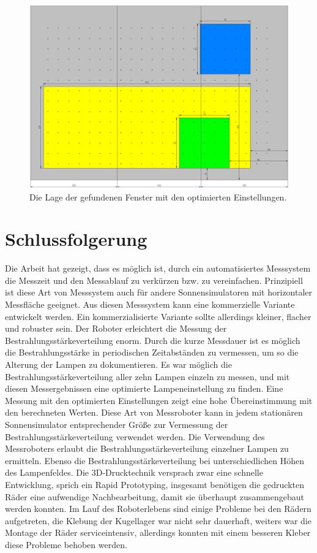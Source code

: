 \documentclass[a4paper,bibtotoc,oneside]{scrbook}
\begin{document}
\begin{figure}[htbp]
\centering
\includegraphics[width=140mm]{img/fensteropt.png}
\caption{Die Lage der gefundenen Fenster mit den optimierten Einstellungen.}\label{fopt}
\end{figure}



\FloatBarrier
 
\section{Schlussfolgerung}\thispagestyle{empty}

Die Arbeit hat gezeigt, dass es möglich ist, durch ein automatisiertes Messsystem die Messzeit und den Messablauf zu verkürzen bzw. zu vereinfachen.
Prinzipiell ist diese Art von Messsystem auch für andere Sonnensimulatoren mit horizontaler Messfläche geeignet.
Aus diesen Messsystem kann eine kommerzielle Variante entwickelt werden.
Ein kommerzialisierte Variante sollte allerdings kleiner, flacher und robuster sein.
Der Roboter erleichtert die Messung der Bestrahlungsstärkeverteilung enorm. Durch die kurze Messdauer ist es möglich die Bestrahlungsstärke in periodischen Zeitabständen zu vermessen, um so die Alterung der Lampen zu dokumentieren. 
Es war möglich die Bestrahlungsstärkeverteilung aller zehn Lampen einzeln zu messen, und mit diesen Messergebnissen eine optimierte Lampeneinstellung zu finden. Eine Messung mit den optimierten Einstellungen zeigt eine hohe Übereinstimmung mit den berechneten Werten. 
Diese Art von Messroboter kann in jedem stationären Sonnensimulator entsprechender Größe zur Vermessung der Bestrahlungsstärkeverteilung verwendet werden. 
Die Verwendung des Messroboters erlaubt die Bestrahlungsstärkeverteilung einzelner Lampen zu ermitteln.
Ebenso die Bestrahlungsstärkeverteilung bei unterschiedlichen Höhen des Lampenfeldes.
Die 3D-Drucktechnik versprach zwar eine schnelle Entwicklung, sprich ein Rapid Prototyping, insgesamt benötigen die gedruckten Räder eine aufwendige Nachbearbeitung, damit sie überhaupt zusammengebaut werden konnten. Im Lauf des Roboterlebens sind einige Probleme bei den Rädern aufgetreten, die Klebung der Kugellager war nicht sehr dauerhaft, weiters war die Montage der Räder serviceintensiv, allerdings konnten mit einem besseren Kleber diese Probleme behoben werden.
\end{document}
